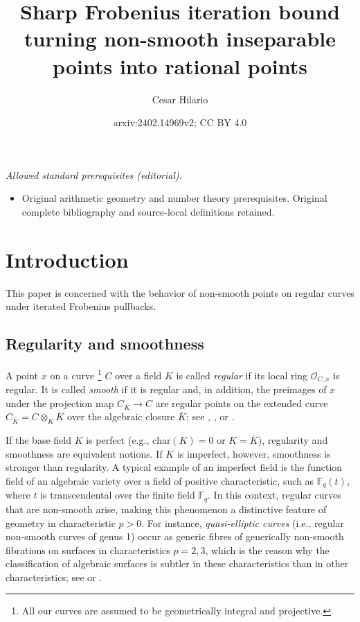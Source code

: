 \documentclass[12pt,reqno]{amsart}%
\title{Sharp Frobenius iteration bound turning non-smooth inseparable points into rational points}
\author{Cesar Hilario}
\date{arxiv:2402.14969v2; CC BY 4.0}
\theoremstyle{definition}
\theoremstyle{remark}
\newcommand{\ov}{\overline}
\newcommand{\F}{\mathbb{F}}
\newcommand{\OO}{\mathcal{O}}
\begin{document}
\maketitle
\noindent\textit{Allowed standard prerequisites (editorial).}\begin{itemize}
\item Original arithmetic geometry and number theory prerequisites. Original complete bibliography and source-local definitions retained.
\end{itemize}\medskip
\section{Introduction}

This paper is concerned with the behavior of non-smooth points on regular curves under iterated Frobenius pullbacks.

\subsection{Regularity and smoothness}
A point $x$ on a curve%
\footnote{All our curves are assumed to be geometrically integral and projective.}
$C$ over a field $K$ is called \emph{regular} if its local ring $\OO_{C,x}$ is regular.
It is called \emph{smooth} if it is regular and, in addition, 
the preimages of $x$ under the projection map $C_{\ov K} \to C$ are regular points on the extended curve $C_{\ov K} = C \otimes_K \ov K$ over the algebraic closure $\ov K$;
see \cite[Chapt.~0, 22.5.8]{EGA4a}, \cite{Fal78}, or \cite[p.\,141]{Liu02}.

If the base field $K$ is perfect (e.g., $\mathrm{char}(K)=0$ or $K = \ov K$),
regularity and smoothness are equivalent notions.
If $K$ is imperfect, however, smoothness is stronger than regularity.
A typical example of an imperfect field is the function field of an algebraic variety over a field of positive characteristic, such as $\F_q(t)$, where $t$ is transcendental over the finite field $\F_q$.
In this context, regular curves that are non-smooth arise, making this phenomenon a distinctive feature of geometry in characteristic $p>0$.
For instance, \emph{quasi-elliptic curves} (i.e., regular non-smooth curves of genus 1) occur as generic fibres of generically non-smooth fibrations on surfaces in characteristics $p=2,3$, which is the reason why the classification of algebraic surfaces is subtler in these characteristics than in other characteristics;
see \cite{BM77,BM76} or \cite[Chapter~4]{CDL23}.
\end{document}
